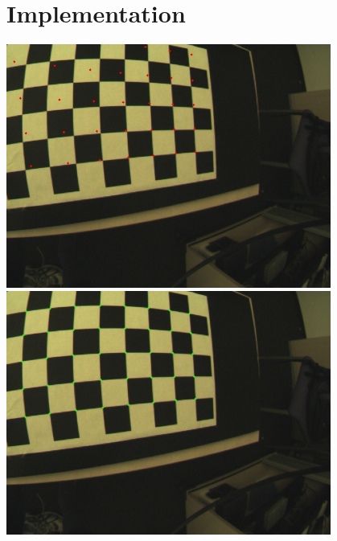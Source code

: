 \documentclass[a4paper, twoside, english]{article}
\begin{document}
\newpage

\part{Implementation}


\includegraphics[width=0.8\textwidth]{red_0.jpg} \\
\includegraphics[width=0.8\textwidth]{green_0.jpg}
\end{document}
